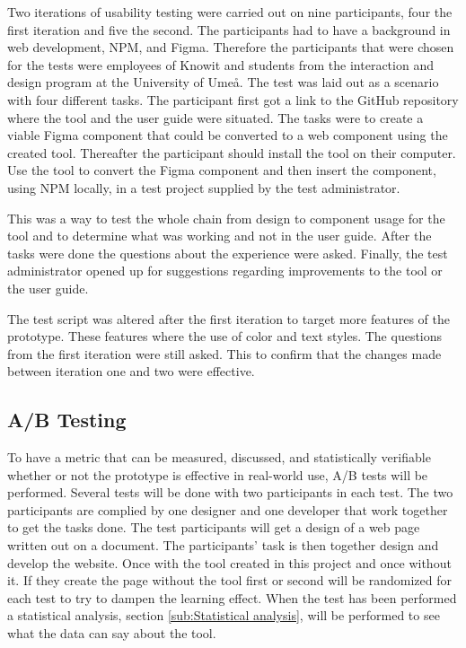 Two iterations of usability testing were carried out on nine participants, four the first iteration and five the second. The participants had to have a background in web development, NPM, and Figma. Therefore the participants that were chosen for the tests were employees of Knowit and students from the interaction and design program at the University of Umeå. The test was laid out as a scenario with four different tasks. The participant first got a link to the GitHub repository where the tool and the user guide were situated. The tasks were to create a viable Figma component that could be converted to a web component using the created tool. Thereafter the participant should install the tool on their computer. Use the tool to convert the Figma component and then insert the component, using NPM locally, in a test project supplied by the test administrator.

This was a way to test the whole chain from design to component usage for the tool and to determine what was working and not in the user guide. After the tasks were done the questions about the experience were asked. Finally, the test administrator opened up for suggestions regarding improvements to the tool or the user guide. 

The test script was altered after the first iteration to target more features of the prototype. These features where the use of color and text styles. The questions from the first iteration were still asked. This to confirm that the changes made between iteration one and two were effective. 



\subsection{ A/B Testing }%
\label{sub:ab-testing}

To have a metric that can be measured, discussed, and statistically verifiable whether or not the prototype is effective in real-world use, A/B tests will be performed. Several tests will be done with two participants in each test. The two participants are complied by one designer and one developer that work together to get the tasks done. The test participants will get a design of a web page written out on a document. The participants' task is then together design and develop the website. Once with the tool created in this project and once without it. If they create the page without the tool first or second will be randomized for each test to try to dampen the learning effect. When the test has been performed a statistical analysis, section \ref{sub:Statistical analysis}, will be performed to see what the data can say about the tool.


